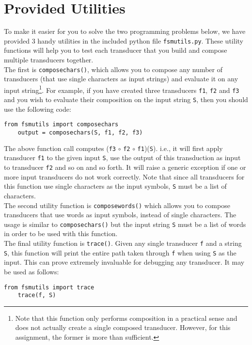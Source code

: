 \documentclass[11pt]{article}
\begin{document}
\section*{Provided Utilities}
To make it easier for you to solve the two programming problems below,
we have provided $3$ handy utilities in the included python file
\texttt{fsmutils.py}. These utility functions will help you to test
each transducer that you build and compose multiple transducers
together.  \\

 The first is \texttt{composechars()}, which allows you to compose any
 number of transducers (that use single characters as input strings)
 and evaluate it on any input string\footnote{Note that this function
   only performs composition in a practical sense and does not
   actually create a single composed transducer. However, for this
   assignment, the former is more than sufficient.}. For example, if
 you have created three transducers \texttt{f1}, \texttt{f2} and
 \texttt{f3} and you wish to evaluate their composition on the input
 string \texttt{S}, then you should use the following code:
	\begin{lstlisting}[label=composechars, frame=trBL,escapechar=*]
	from fsmutils import composechars
	output = composechars(S, f1, f2, f3)
	\end{lstlisting}
	The above function call computes (\texttt{f3} $\circ$
        \texttt{f2} $\circ$ \texttt{f1})(\texttt{S}). i.e., it will
        first apply transducer \texttt{f1} to the given input
        \texttt{S}, use the output of this transduction as input to
        transducer \texttt{f2} and so on and so forth. It will raise a
        generic exception if one or more input transducers do not work
        correctly. Note that since all transducers for this function
        use single characters as the input symbols, \texttt{S} must be
        a list of characters. \\

 The second utility function is \texttt{composewords()} which allows
 you to compose transducers that use words as input symbols, instead
 of single characters. The usage is similar to \texttt{composechars()}
 but the input string \texttt{S} must be a list of words in order to
 be used with this function. \\

 The final utility function is \texttt{trace()}. Given any single
 transducer \texttt{f} and a string \texttt{S}, this function will
 print the entire path taken through \texttt{f} when using \texttt{S}
 as the input. This can prove extremely invaluable for debugging any
 transducer. It may be used as follows:
	\begin{lstlisting}[label=trace, frame=trBL,escapechar=*]
	from fsmutils import trace
	trace(f, S)
	\end{lstlisting}
\end{document}
